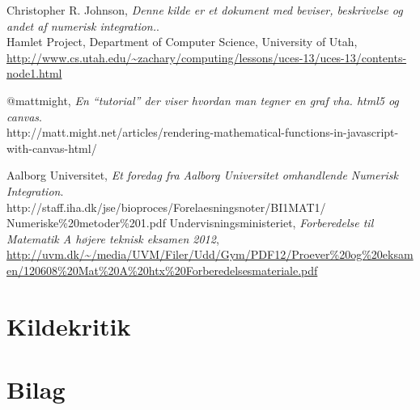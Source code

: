 \documentclass[12pt]{article}
\numberwithin{equation}{section}
\begin{document}
\clearpage
{}
\begin{thebibliography}{9}

  	Christopher R. Johnson,
  	\emph{Denne kilde er et dokument med beviser, beskrivelse og andet af numerisk integration.}.\\
  	Hamlet Project, 
  	Department of Computer Science,
	University of Utah,
	\url{http://www.cs.utah.edu/~zachary/computing/lessons/uces-13/uces-13/contents-node1.html}
	
	@mattmight,
	\emph{En ``tutorial'' der viser hvordan man tegner en graf vha. html5 og canvas}.\\
	http://matt.might.net/articles/rendering-mathematical-functions-in-javascript-with-canvas-html/

	Aalborg Universitet,
	\emph{Et foredag fra Aalborg Universitet omhandlende Numerisk Integration}.\\
	http://staff.iha.dk/jse/bioproces/Forelaesningsnoter/BI1MAT1/\\Numeriske\%20metoder\%201.pdf
	Undervisningsministeriet,
	\emph{Forberedelse til Matematik A højere teknisk eksamen 2012},
	\url{http://uvm.dk/~/media/UVM/Filer/Udd/Gym/PDF12/Proever\%20og\%20eksamen/120608\%20Mat\%20A\%20htx\%20Forberedelsesmateriale.pdf}

\end{thebibliography}

\section{Kildekritik}
\section{Bilag}
\end{document}
